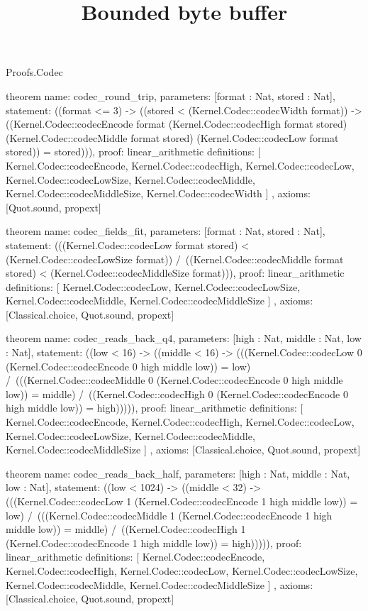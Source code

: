 \begin{lexlean}{Proofs.Codec}
\title{Bounded byte buffer}
\begin{semanticmodule}
theorem{
  name: codec_round_trip,
  parameters: [format : Nat, stored : Nat],
  statement: ((format <= 3) -> ((stored < (Kernel.Codec::codecWidth format)) -> ((Kernel.Codec::codecEncode format (Kernel.Codec::codecHigh format stored) (Kernel.Codec::codecMiddle format stored) (Kernel.Codec::codecLow format stored)) = stored))),
  proof: linear_arithmetic{
    definitions: [
      Kernel.Codec::codecEncode,
      Kernel.Codec::codecHigh,
      Kernel.Codec::codecLow,
      Kernel.Codec::codecLowSize,
      Kernel.Codec::codecMiddle,
      Kernel.Codec::codecMiddleSize,
      Kernel.Codec::codecWidth
    ]
  },
  axioms: [Quot.sound, propext]
}

theorem{
  name: codec_fields_fit,
  parameters: [format : Nat, stored : Nat],
  statement: (((Kernel.Codec::codecLow format stored) < (Kernel.Codec::codecLowSize format)) /\ ((Kernel.Codec::codecMiddle format stored) < (Kernel.Codec::codecMiddleSize format))),
  proof: linear_arithmetic{
    definitions: [
      Kernel.Codec::codecLow,
      Kernel.Codec::codecLowSize,
      Kernel.Codec::codecMiddle,
      Kernel.Codec::codecMiddleSize
    ]
  },
  axioms: [Classical.choice, Quot.sound, propext]
}

theorem{
  name: codec_reads_back_q4,
  parameters: [high : Nat, middle : Nat, low : Nat],
  statement: ((low < 16) -> ((middle < 16) -> (((Kernel.Codec::codecLow 0 (Kernel.Codec::codecEncode 0 high middle low)) = low) /\ (((Kernel.Codec::codecMiddle 0 (Kernel.Codec::codecEncode 0 high middle low)) = middle) /\ ((Kernel.Codec::codecHigh 0 (Kernel.Codec::codecEncode 0 high middle low)) = high))))),
  proof: linear_arithmetic{
    definitions: [
      Kernel.Codec::codecEncode,
      Kernel.Codec::codecHigh,
      Kernel.Codec::codecLow,
      Kernel.Codec::codecLowSize,
      Kernel.Codec::codecMiddle,
      Kernel.Codec::codecMiddleSize
    ]
  },
  axioms: [Classical.choice, Quot.sound, propext]
}

theorem{
  name: codec_reads_back_half,
  parameters: [high : Nat, middle : Nat, low : Nat],
  statement: ((low < 1024) -> ((middle < 32) -> (((Kernel.Codec::codecLow 1 (Kernel.Codec::codecEncode 1 high middle low)) = low) /\ (((Kernel.Codec::codecMiddle 1 (Kernel.Codec::codecEncode 1 high middle low)) = middle) /\ ((Kernel.Codec::codecHigh 1 (Kernel.Codec::codecEncode 1 high middle low)) = high))))),
  proof: linear_arithmetic{
    definitions: [
      Kernel.Codec::codecEncode,
      Kernel.Codec::codecHigh,
      Kernel.Codec::codecLow,
      Kernel.Codec::codecLowSize,
      Kernel.Codec::codecMiddle,
      Kernel.Codec::codecMiddleSize
    ]
  },
  axioms: [Classical.choice, Quot.sound, propext]
}


\end{semanticmodule}
\end{lexlean}
